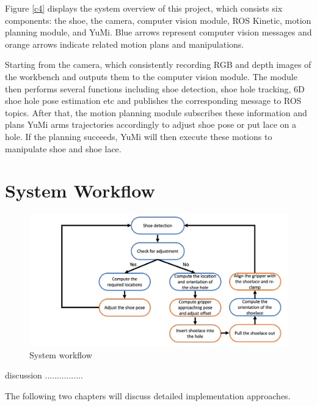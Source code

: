 Figure \ref{c4} displays the system overview of this project, which consists six components: the shoe, the camera, computer vision module, ROS Kinetic, motion planning module, and YuMi. Blue arrows represent computer vision messages and orange arrows indicate related motion plans and manipulations.

Starting from the camera, which consistently recording RGB and depth images of the workbench and outputs them to the computer vision module. The module then performs several functions including shoe detection, shoe hole tracking, 6D shoe hole pose estimation etc and publishes the corresponding message to ROS topics. After that, the motion planning module subscribes these information and plans YuMi arms trajectories accordingly to adjust shoe pose or put lace on a hole. If the planning succeeds, YuMi will then execute these motions to manipulate shoe and shoe lace.

\section{System Workflow}

\begin{figure}[H]
\centering
\includegraphics[width = \columnwidth]{AnalysisDesign/workflow.png}
\caption{System workflow}
\label{workflow}
\end{figure}

discussion ................

The following two chapters will discuss detailed implementation approaches.